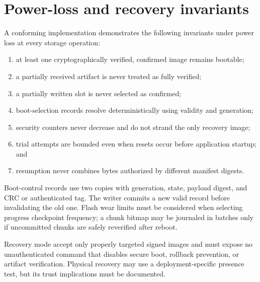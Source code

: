 \section{Power-loss and recovery invariants}

A conforming implementation demonstrates the following invariants under power
loss at every storage operation:

\begin{enumerate}
  \item at least one cryptographically verified, confirmed image remains bootable;
  \item a partially received artifact is never treated as fully verified;
  \item a partially written slot is never selected as confirmed;
  \item boot-selection records resolve deterministically using validity and generation;
  \item security counters never decrease and do not strand the only recovery image;
  \item trial attempts are bounded even when resets occur before application startup; and
  \item resumption never combines bytes authorized by different manifest digests.
\end{enumerate}

Boot-control records \should use two copies with generation, state, payload digest,
and CRC or authenticated tag. The writer commits a new valid record before
invalidating the old one. Flash wear limits must be considered when selecting
progress checkpoint frequency; a chunk bitmap may be journaled in batches only
if uncommitted chunks are safely reverified after reboot.

Recovery mode \must accept only properly targeted signed images and must expose
no unauthenticated command that disables secure boot, rollback prevention, or
artifact verification. Physical recovery may use a deployment-specific presence
test, but its trust implications must be documented.

